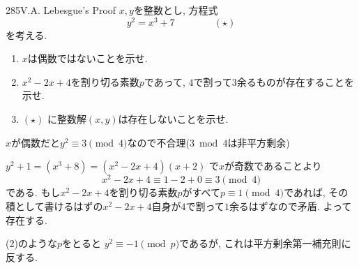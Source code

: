 \begin{thm}{285}{}{V.A. Lebesgue's Proof}
$x,y$を整数とし, 方程式
$$
y^2 = x^3 + 7\qquad\qquad (\star)
$$
を考える. 
\begin{enumerate}
\item $x$は偶数ではないことを示せ.
\item $x^2 - 2x + 4$を割り切る素数$p$であって, $4$で割って$3$余るものが存在することを示せ. 
\item $(\star)$ に整数解$(x,y)$は存在しないことを示せ. 
\end{enumerate}
\end{thm}

$x$が偶数だと$y^2\equiv 3\pmod{4}$なので不合理($3\bmod{4}$は非平方剰余)

$y^2 + 1 = (x^3 + 8) = (x^2 - 2x + 4)(x+2)$ で$x$が奇数であることより
$$
x^2 - 2x + 4 \equiv 1 - 2 + 0 \equiv 3\pmod{4}
$$
である. もし$x^2 - 2x + 4$を割り切る素数$p$がすべて$p\equiv 1\pmod{4}$であれば, その積として書けるはずの$x^2 - 2x + 4$自身が$4$で割って$1$余るはずなので矛盾. よって存在する. 

(2)のような$p$をとると $y^2 \equiv -1\pmod{p}$であるが, これは平方剰余第一補充則に反する. 

